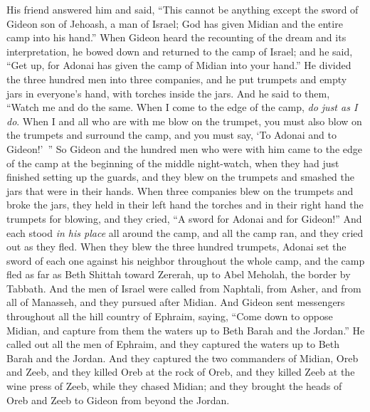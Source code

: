 \begin{biblechapter}
\verse His friend answered him and said, “This cannot be anything except the sword of Gideon son of Jehoash, a man of Israel; God has given Midian and the entire camp into his hand.”
\verse When Gideon heard the recounting of the dream and its interpretation, he bowed down and returned to the camp of Israel; and he said, “Get up, for Adonai has given the camp of Midian into your hand.”
\verse He divided the three hundred men into three companies, and he put trumpets and empty jars in everyone’s hand, with torches inside the jars.
\verse And he said to them, “Watch me and do the same. When I come to the edge of the camp, \textit{do just as I do}.
\verse When I and all who are with me blow on the trumpet, you must also blow on the trumpets and surround the camp, and you must say, ‘To Adonai and to Gideon!’ ”
\verse So Gideon and the hundred men who were with him came to the edge of the camp at the beginning of the middle night-watch, when they had just finished setting up the guards, and they blew on the trumpets and smashed the jars that were in their hands.
\verse When three companies blew on the trumpets and broke the jars, they held in their left hand the torches and in their right hand the trumpets for blowing, and they cried, “A sword for Adonai and for Gideon!”
\verse And each stood \textit{in his place} all around the camp, and all the camp ran, and they cried out as they fled.
\verse When they blew the three hundred trumpets, Adonai set the sword of each one against his neighbor throughout the whole camp, and the camp fled as far as Beth Shittah toward Zererah, up to Abel Meholah, the border by Tabbath.
\verse And the men of Israel were called from Naphtali, from Asher, and from all of Manasseh, and they pursued after Midian.
\verse And Gideon sent messengers throughout all the hill country of Ephraim, saying, “Come down to oppose Midian, and capture from them the waters up to Beth Barah and the Jordan.” He called out all the men of Ephraim, and they captured the waters up to Beth Barah and the Jordan.
\verse And they captured the two commanders of Midian, Oreb and Zeeb, and they killed Oreb at the rock of Oreb, and they killed Zeeb at the wine press of Zeeb, while they chased Midian; and they brought the heads of Oreb and Zeeb to Gideon from beyond the Jordan.
\end{biblechapter}

